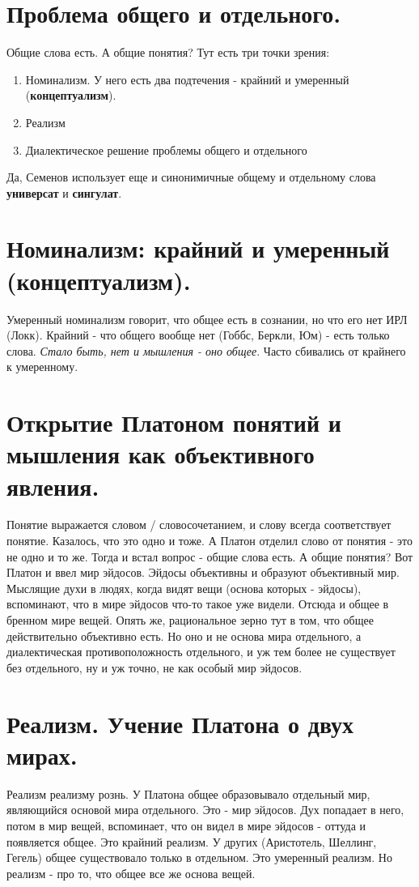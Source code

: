 \section{ Проблема общего и отдельного.}
Общие слова есть. А общие понятия? Тут есть три точки зрения:
\begin{enumerate}
\item Номинализм. У него есть два подтечения - крайний и умеренный (\textbf{концептуализм}).
\item Реализм
\item Диалектическое решение проблемы общего и отдельного
\end{enumerate}
Да, Семенов  использует еще и синонимичные общему и отдельному слова \textbf{универсат} и \textbf{сингулат}.

\section{ Номинализм: крайний и умеренный (концептуализм).}
Умеренный номинализм говорит, что общее есть в сознании, но что его нет ИРЛ (Локк). Крайний - что общего вообще нет (Гоббс, Беркли, Юм) - есть только слова. \textit{Стало быть, нет и мышления - оно общее}. Часто сбивались от крайнего к умеренному.

\section{ Открытие Платоном понятий и мышления как объективного явления.}
Понятие выражается словом / словосочетанием, и слову всегда соответствует понятие. Казалось, что это одно и тоже. А Платон отделил слово от понятия - это не одно и то же. Тогда и встал вопрос -  общие слова есть. А общие понятия? Вот Платон и ввел мир эйдосов. Эйдосы объективны и образуют объективный мир. Мыслящие духи в людях, когда видят вещи (основа которых - эйдосы), вспоминают, что в мире эйдосов что-то такое уже видели. Отсюда и общее в бренном мире вещей. Опять же, рациональное зерно тут в том, что общее действительно объективно есть. Но оно и не основа мира отдельного, а диалектическая противоположность отдельного, и уж тем более не существует без отдельного, ну и уж точно, не  как особый мир эйдосов. 

\section{ Реализм. Учение Платона о двух мирах.}
Реализм реализму рознь. У Платона общее образовывало отдельный мир, являющийся основой мира отдельного. Это - мир эйдосов. Дух попадает в него, потом в мир вещей, вспоминает, что он видел в мире эйдосов - оттуда и появляется общее. Это крайний реализм. У других (Аристотель, Шеллинг, Гегель) общее существовало только в отдельном. Это умеренный реализм. Но реализм - про то, что общее все же основа вещей.

